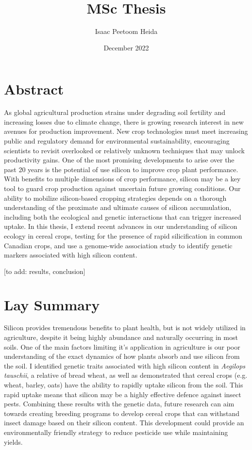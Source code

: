\documentclass[12pt, letterpaper, ]{report}
\title{MSc Thesis}
\author{Isaac Peetoom Heida}
\date{December 2022}
\begin{document}


\tableofcontents

\chapter{Abstract}

As global agricultural production strains under degrading soil fertility and increasing losses due to climate change, there is growing research interest in new avenues for production improvement. New crop technologies must meet increasing public and regulatory demand for environmental sustainability, encouraging scientists to revisit overlooked or relatively unknown techniques that may unlock productivity gains. One of the most promising developments to arise over the past 20 years is the potential of use silicon to improve crop plant performance. With benefits to multiple dimensions of crop performance, silicon may be a key tool to guard crop production against uncertain future growing conditions. Our ability to mobilize silicon-based cropping strategies depends on a thorough understanding of the proximate and ultimate causes of silicon accumulation, including both the ecological and genetic interactions that can trigger increased uptake. In this thesis, I extend recent advances in our understanding of silicon ecology in cereal crops, testing for the presence of rapid silicification in common Canadian crops, and use a  genome-wide association study to identify genetic markers associated with high silicon content. 

[to add: results, conclusion]

\chapter{Lay Summary}

Silicon provides tremendous benefits to plant health, but is not widely utilized in agriculture, despite it being highly abundance and naturally occurring in most soils. One of the main factors limiting it's application in agriculture is our poor understanding of the exact dynamics of how plants absorb and use silicon from the soil. I identified genetic traits associated with high silicon content in \textit{Aegilops tauschii}, a relative of bread wheat, as well as demonstrated that cereal crops (e.g. wheat, barley, oats) have the ability to rapidly uptake silicon from the soil. This rapid uptake means that silicon may be a highly effective defence against insect pests. Combining these results with the genetic data, future research can aim towards creating breeding programs to develop cereal crops that can withstand insect damage based on their silicon content. This development could provide an environmentally friendly strategy to reduce pesticide use while maintaining yields.
\end{document}
